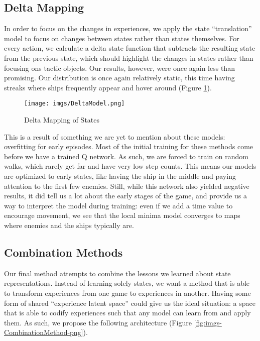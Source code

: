 \documentclass{article} %
\begin{document}
\subsection{Delta Mapping}
In order to focus on the changes in experiences, we apply the state ``translation'' model to focus on
changes between states rather than states themselves. For every action, we calculate a delta state
function that subtracts the resulting state from the previous state, which should highlight the
changes in states rather than focusing ons tactic objects. Our results, however, were once again
less than promising. Our distribution is once again relatively static, this time having streaks
where ships frequently appear and hover around (Figure \ref{fig:imgs-DeltaModel-png}).

\begin{figure}[htpb]
  \centering
  \texttt{[image: imgs/DeltaModel.png]}
  \caption{Delta Mapping of States}
  \label{fig:imgs-DeltaModel-png}
\end{figure}

This is a result of something we are yet to mention about these models: overfitting for early
episodes. Most of the initial training for these methods come before we have a trained Q network. As
such, we are forced to train on random walks, which rarely get far and have very low step counts.
This means our models are optimized to early states, like having the ship in the middle and paying
attention to the first few enemies. Still, while this network also yielded negative results, it did
tell us a lot about the early stages of the game, and provide us a way to interpret the model during
training: even if we add a time value to encourage movement, we see that the local minima model
converges to maps where enemies and the ships typically are.

\subsection{Combination Methods}
Our final method attempts to combine the lessons we learned about state representations. Instead of
learning solely states, we want a method that is able to transform experiences from one game to
experiences in another. Having some form of shared ``experience latent space'' could give us the
ideal situation: a space that is able to codify experiences such that any model can learn from and
apply them. As such, we propose the following architecture (Figure
\ref{fig:imgs-CombinationMethod-png}). 
\end{document}
